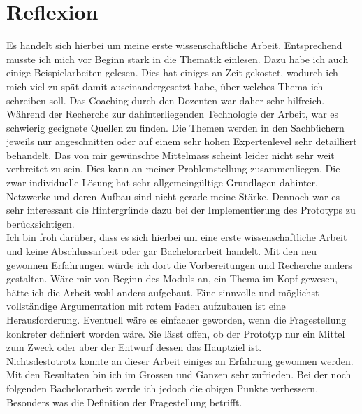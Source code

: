 \chapter{Reflexion}
Es handelt sich hierbei um meine erste wissenschaftliche Arbeit. 
Entsprechend musste ich mich vor Beginn stark in die Thematik einlesen. Dazu habe ich auch einige Beispielarbeiten gelesen.
Dies hat einiges an Zeit gekostet, wodurch ich mich viel zu spät damit auseinandergesetzt habe, 
über welches Thema ich schreiben soll. Das Coaching durch den Dozenten war daher sehr hilfreich. 
Während der Recherche zur dahinterliegenden Technologie der Arbeit, war es schwierig geeignete Quellen zu finden.
Die Themen werden in den Sachbüchern jeweils nur angeschnitten oder auf einem sehr hohen Expertenlevel sehr detailliert behandelt.
Das von mir gewünschte Mittelmass scheint leider nicht sehr weit verbreitet zu sein.
Dies kann an meiner Problemstellung zusammenliegen. Die zwar individuelle Lösung hat sehr allgemeingültige Grundlagen dahinter.
Netzwerke und deren Aufbau sind nicht gerade meine Stärke. 
Dennoch war es sehr interessant die Hintergründe dazu bei der Implementierung des Prototyps zu berücksichtigen.
\\
Ich bin froh darüber, dass es sich hierbei um eine erste wissenschaftliche Arbeit und keine Abschlussarbeit oder gar Bachelorarbeit handelt.
Mit den neu gewonnen Erfahrungen würde ich dort die Vorbereitungen und Recherche anders gestalten. 
Wäre mir von Beginn des Moduls an, ein Thema im Kopf gewesen, hätte ich die Arbeit wohl anders aufgebaut. 
Eine sinnvolle und möglichst vollständige Argumentation mit rotem Faden aufzubauen ist eine Herausforderung. 
Eventuell wäre es einfacher geworden, wenn die Fragestellung konkreter definiert worden wäre. 
Sie lässt offen, ob der Prototyp nur ein Mittel zum Zweck oder aber der Entwurf dessen das Hauptziel ist. 
\\
Nichtsdestotrotz konnte an dieser Arbeit einiges an Erfahrung gewonnen werden. Mit den Resultaten bin ich im Grossen und Ganzen sehr zufrieden.
Bei der noch folgenden Bachelorarbeit werde ich jedoch die obigen Punkte verbessern. Besonders was die Definition der Fragestellung betrifft.